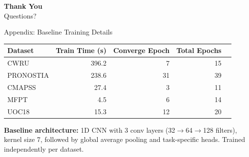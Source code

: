 \documentclass[aspectratio=169, 11pt]{beamer}
\begin{document}

\begin{frame}{}
\vfill
\begin{center}
{\Huge\textbf{Thank You}}\\[1cm]
{\large Questions?}
\end{center}
\vfill
\end{frame}


\appendix

\begin{frame}{Appendix: Baseline Training Details}
\begin{table}
\centering
\begin{tabular}{@{}lrrrr@{}}
\toprule
\textbf{Dataset} & \textbf{Train Time (s)} & \textbf{Converge Epoch} & \textbf{Total Epochs} \\
\midrule
CWRU      & 396.2 & 7  & 15 \\
PRONOSTIA & 238.6 & 31 & 39 \\
CMAPSS    & 27.4  & 3  & 11 \\
MFPT      & 4.5   & 6  & 14 \\
UOC18     & 15.3  & 12 & 20 \\
\bottomrule
\end{tabular}
\end{table}

\vspace{0.3cm}
\textbf{Baseline architecture:} 1D CNN with 3 conv layers (32$\to$64$\to$128 filters), kernel size 7, followed by global average pooling and task-specific heads. Trained independently per dataset.
\end{frame}
\end{document}
